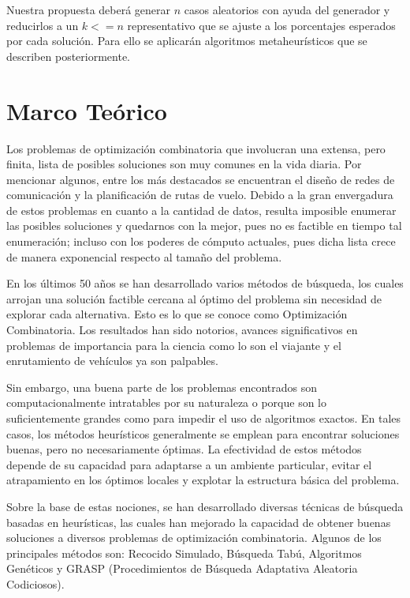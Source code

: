 \documentclass[a4paper,12pt]{book}
\begin{document}
		Nuestra propuesta deberá generar $n$ casos aleatorios con ayuda del generador y reducirlos a un $k <= n$ representativo que se ajuste a los porcentajes esperados por cada solución. Para ello se aplicarán algoritmos metaheurísticos que se describen posteriormente.
		
	

\chapter{Marco Teórico}
	Los problemas de optimización combinatoria que involucran una extensa, pero finita, lista de posibles soluciones son muy comunes en la vida diaria. Por mencionar algunos, entre los más destacados se encuentran el diseño de redes de comunicación y la planificación de rutas de vuelo. Debido a la gran envergadura de estos problemas en cuanto a la cantidad de datos, resulta imposible enumerar las posibles soluciones y quedarnos con la mejor, pues no es factible en tiempo tal enumeración; incluso con los poderes de cómputo actuales, pues dicha lista crece de manera exponencial respecto al tamaño del problema.
	
	En los últimos 50 años se han desarrollado varios métodos de búsqueda, los cuales arrojan una solución factible cercana al óptimo del problema sin necesidad de explorar cada alternativa. Esto es lo que se conoce como Optimización Combinatoria. Los resultados han sido notorios, avances significativos en problemas de importancia para la ciencia como lo son el viajante y el enrutamiento de vehículos ya son palpables.
	
	Sin embargo, una buena parte de los problemas encontrados son computacionalmente intratables por su naturaleza o porque son lo suficientemente grandes como para impedir el uso de algoritmos exactos. En tales casos, los métodos heurísticos generalmente se emplean para encontrar soluciones buenas, pero no necesariamente óptimas. La efectividad de estos métodos depende de su capacidad para adaptarse a un ambiente particular, evitar el atrapamiento en los óptimos locales y explotar la estructura básica del problema.
	
	Sobre la base de estas nociones, se han desarrollado diversas técnicas de búsqueda basadas en heurísticas, las cuales han mejorado la capacidad de obtener buenas soluciones a diversos problemas de optimización combinatoria. Algunos de los principales métodos son: Recocido Simulado, Búsqueda Tabú, Algoritmos Genéticos y GRASP (Procedimientos de Búsqueda Adaptativa Aleatoria Codiciosos).
	
\end{document}
